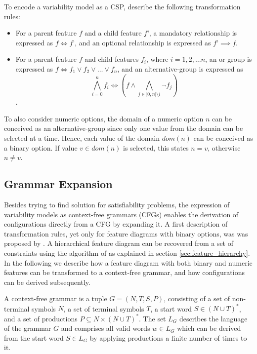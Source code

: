 To encode a variability model as a CSP, \cite{benavides_automated_2005} describe
the following transformation rules:

\begin{itemize}
  \item For a parent feature $f$ and a child feature $f’$, a mandatory
  relationship is expressed as $f \Leftrightarrow f’$, and an optional relationship is
  expressed as $f’ \implies f$.
    \item  For a parent feature $f$ and child features $f_i$, where $i = 1, 2,
    \ldots n$, an or-group is expressed as $f \Leftrightarrow f_1 \lor f_2 \lor
    \ldots \lor f_n$, and an alternative-group is expressed as $$\bigwedge_{i
    = 0}^n f_i \Leftrightarrow (f \land \bigwedge_{j \in \lbrack 0, n \rbrack
    \setminus i} \neg f_j) $$.
\end{itemize}

To also consider numeric options, the domain of a numeric option $n$ can be
conceived as an alternative-group since only one value from the domain can be
selected at a time. Hence, each value of the domain $dom(n)$ can be conceived as
a binary option. If value $v \in dom(n)$ is selected, this states $n = v$,
otherwise $n \neq v$.


\subsection{Grammar Expansion}
Besides trying to find solution for satisfiability problems, the expression of
variability models as context-free grammars (CFGs) enables the derivation of
configurations directly from a CFG by expanding it. A
first description of transformation rules, yet only for feature diagrams with
binary options, was was proposed by \cite{batory_feature_2005}. A hierarchical feature diagram
can be recovered from a set of constraints using the algorithm of
\cite{she_reverse_2011} as explained in section \ref{sec:feature_hierarchy}.
In the following we describe
how a feature diagram with both binary and numeric features can be transformed
to a context-free grammar, and how configurations can be derived subsequently.

\begin{definition}\label{def:cfg}
A context-free grammar is a tuple $G = (N, T, S, P)$, consisting of a set of
non-terminal symbols $N$, a set of terminal symbols $T$, a start word $S \in (N
\cup T)^*$, and a set of productions $P \subseteq N \times (N \cup T)^*$. The
set $L_G$ describes the language of the grammar $G$ and comprises all valid
words $w \in L_G$ which can be derived from the start word $S \in L_G$ by
applying productions a finite number of times to it.
\end{definition}

